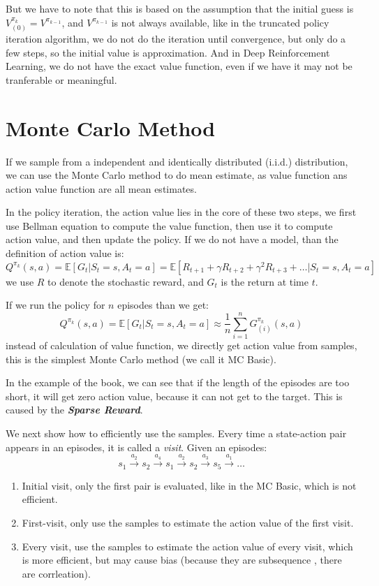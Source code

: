 \documentclass[10pt]{elegantbook}
\newcommand{\mydefination}[1]{\textbf{\textit{\textcolor{structurecolor}{#1}}}}
\begin{document}
But we have to note that this is based on the assumption that the initial guess is $V^{\pi_k}_{(0)} = V^{\pi_{k-1}}$, 
and $V^{\pi_{k-1}}$ is not always available, like in the truncated policy iteration algorithm, we do not do the iteration until convergence, 
but only do a few steps, so the initial value is approximation. And in Deep Reinforcement Learning, we do not have the exact value function, 
even if we have it may not be tranferable or meaningful.



\section{Monte Carlo Method}
If we sample from a independent and identically distributed (i.i.d.) distribution, we can use the Monte Carlo method to do mean estimate, as value function 
ans action value function are all mean estimates.

In the policy iteration, the action value lies in the core of these two steps, we first use Bellman equation to compute the value function, then use it 
to compute action value, and then update the policy. If we do not have a model, than the definition of action value is:
\[ Q^{\pi_k}(s, a) = \mathbb E[G_t | S_t = s, A_t = a] = \mathbb E[R_{t+1} + \gamma R_{t+2} + \gamma^2 R_{t+3} + \dots | S_t = s, A_t = a] \]
we use $R$ to denote the stochastic reward, and $G_t$ is the return at time $t$.

If we run the policy for $n$ episodes than we get:
\begin{equation}
    Q^{\pi_k}(s, a) = \mathbb E[G_t | S_t = s, A_t = a] \approx \frac{1}{n} \sum_{i=1}^{n} G^{\pi_k}_{(i)}(s, a)
\end{equation}
instead of calculation of value function, we directly get action value from samples, this is the simplest Monte Carlo method (we call it MC Basic).

In the example of the book, we can see that if the length of the episodes are too short, it will get zero action value, because it can not get to 
the target. This is caused by the \mydefination{Sparse Reward}.

We next show how to efficiently use the samples. Every time a state-action pair appears in an episodes, it is called a \textit{visit}.
Given an episodes:
\[ s_1 \xrightarrow{a_2} s_2 \xrightarrow{a_4} s_1 \xrightarrow{a_2} s_2 \xrightarrow{a_3} s_5 \xrightarrow{a_1} \dots \]

\begin{enumerate}
    \item Initial visit, only the first pair is evaluated, like in the MC Basic, which is not efficient.
    \item First-visit, only use the samples to estimate the action value of the first visit.
    \item Every visit, use the samples to estimate the action value of every visit, which is more efficient, but may cause bias (because they are subsequence
    , there are corrleation).
\end{enumerate}
\end{document}
